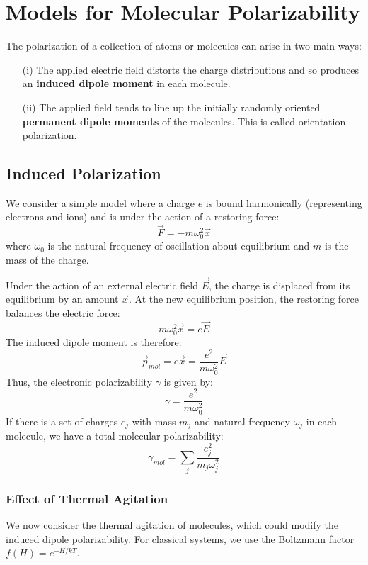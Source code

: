 \documentclass{article}
\begin{document}
	\section{Models for Molecular Polarizability}
	
	The polarization of a collection of atoms or molecules can arise in two main ways:
	\begin{enumerate}
		\item[(i)] The applied electric field distorts the charge distributions and so produces an \textbf{induced dipole moment} in each molecule.
		\item[(ii)] The applied field tends to line up the initially randomly oriented \textbf{permanent dipole moments} of the molecules. This is called orientation polarization.
	\end{enumerate}
	
	\subsection{Induced Polarization}
	
	We consider a simple model where a charge $e$ is bound harmonically (representing electrons and ions) and is under the action of a restoring force:
	\[
	\vec{F} = -m\omega_0^2 \vec{x}
	\]
	where $\omega_0$ is the natural frequency of oscillation about equilibrium and $m$ is the mass of the charge.
	
	Under the action of an external electric field $\vec{E}$, the charge is displaced from its equilibrium by an amount $\vec{x}$. At the new equilibrium position, the restoring force balances the electric force:
	\[
	m\omega_0^2 \vec{x} = e\vec{E}
	\]
	The induced dipole moment is therefore:
	\[
	\vec{p}_{mol} = e\vec{x} = \frac{e^2}{m\omega_0^2} \vec{E}
	\]
	Thus, the electronic polarizability $\gamma$ is given by:
	\[
	\gamma = \frac{e^2}{m\omega_0^2}
	\]
	If there is a set of charges $e_j$ with mass $m_j$ and natural frequency $\omega_j$ in each molecule, we have a total molecular polarizability:
	\[
	\gamma_{mol} = \sum_j \frac{e_j^2}{m_j \omega_j^2}
	\]
	
	\subsubsection*{Effect of Thermal Agitation}
	We now consider the thermal agitation of molecules, which could modify the induced dipole polarizability. For classical systems, we use the Boltzmann factor $f(H) = e^{-H/kT}$.
	
\end{document}
